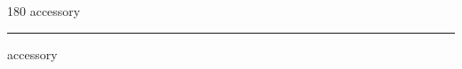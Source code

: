 
\begin{frame}
\begin{center}
\begin{turn}{180}
{\fontsize{2.5cm}{1em}\selectfont accessory}
\end{turn}
\vspace{1em}\par  
\hrule
\vspace{1em}\par  
{\fontsize{2.5cm}{1em}\selectfont accessory}
\end{center}
\end{frame}
